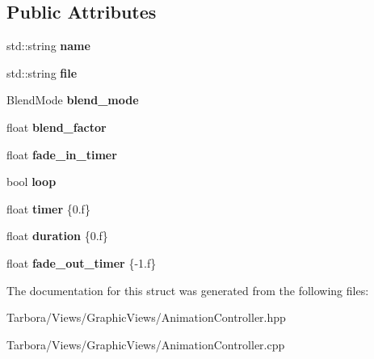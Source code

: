 \subsection*{Public Attributes}
\begin{DoxyCompactItemize}
\item 
\mbox{\label{structTarbora_1_1Animation_a6a0ed549c9377e507e01019e45b2d904}} 
std\+::string {\bfseries name}
\item 
\mbox{\label{structTarbora_1_1Animation_a459770a5d20a315344cde15dd0031ecb}} 
std\+::string {\bfseries file}
\item 
\mbox{\label{structTarbora_1_1Animation_a484d6813d70493bf607264eea0408cab}} 
Blend\+Mode {\bfseries blend\+\_\+mode}
\item 
\mbox{\label{structTarbora_1_1Animation_aeb4c3f740140709df580bc657eb425d5}} 
float {\bfseries blend\+\_\+factor}
\item 
\mbox{\label{structTarbora_1_1Animation_a0d88700240a0dfdf762d8b507d10c56a}} 
float {\bfseries fade\+\_\+in\+\_\+timer}
\item 
\mbox{\label{structTarbora_1_1Animation_a85519d8253039980c275ba4c12b1b1cf}} 
bool {\bfseries loop}
\item 
\mbox{\label{structTarbora_1_1Animation_a6411f6a3a4b59760785e3d138b99fdc0}} 
float {\bfseries timer} \{0.f\}
\item 
\mbox{\label{structTarbora_1_1Animation_a215ea2011d37bfe6d43b78a9dc00a01a}} 
float {\bfseries duration} \{0.f\}
\item 
\mbox{\label{structTarbora_1_1Animation_a1d255cfd1429471dcf5d322ca34860c6}} 
float {\bfseries fade\+\_\+out\+\_\+timer} \{-\/1.f\}
\end{DoxyCompactItemize}


The documentation for this struct was generated from the following files\+:\begin{DoxyCompactItemize}
\item 
Tarbora/\+Views/\+Graphic\+Views/Animation\+Controller.\+hpp\item 
Tarbora/\+Views/\+Graphic\+Views/Animation\+Controller.\+cpp\end{DoxyCompactItemize}
